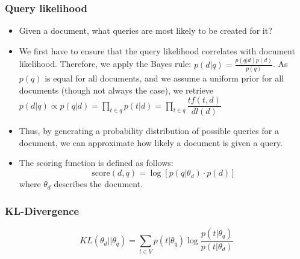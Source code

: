 \subsubsection{Query likelihood}
\begin{itemize}
	\item Given a document, what queries are most likely to be created for it? 
	\item We first have to ensure that the query likelihood correlates with document likelihood. Therefore, we apply the Bayes rule: $p(d|q) = \frac{p(q|d)p(d)}{p(q)}$. As $p(q)$ is equal for all documents, and we assume a uniform prior for all documents (though not always the case), we retrieve $p(d|q)\propto p(q|d) = \prod_{t \in q} p(t|d) = \prod_{t \in q} \dfrac{tf(t,d)}{dl(d)}$
	\item Thus, by generating a probability distribution of possible queries for a document, we can approximate how likely a document is given a query.
	\item The scoring function is defined as follows:
	$$\text{score}(d,q) = \log \left[p(q|\theta_d)\cdot p(d)\right]$$
	where $\theta_d$ describes the document.
\end{itemize}
\subsubsection{KL-Divergence}
$$ KL(\theta_d || \theta_q) = \sum_{t \in V} p(t|\theta_q) \log \dfrac{p(t|\theta_q)}{p(t|\theta_d)} $$
